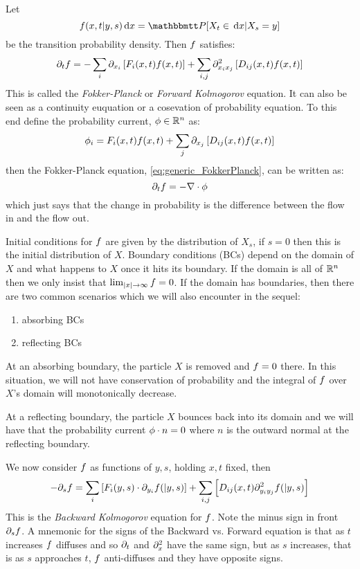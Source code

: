 Let 
\begin{equation}
 \f(x,t| y,s) \intd{x} =  \Prob[X_t \in \intd{x} | X_s = y]
 \label{eq:transition_prob_defn} 
 \end{equation}
be the transition probability density. Then ${f}$ satisfies:
\begin{equation}
{\partial}_t {f}= -\sum_i {\partial}_{x_i} \left[ F_i(x,t) {f}(x,t) \right] 
+ 
\sum_{i,j}  {\partial}^2_{x_i x_j} \left[ D_{ij}(x,t) {f}(x,t) \right]
\label{eq:generic_FokkerPlanck}
\end{equation} 
This is called the \emph{Fokker-Planck} or \emph{Forward Kolmogorov} equation.
It can also be seen as a continuity euquation or a cosevation of probability
equation. To this end define the probability current, ${ \phi } \in { \mathbb{R} }^n$ as:
$$
\phi_i =   F_i(x,t) {f}(x,t) 
+ 
\sum_{j}  {\partial}_{x_j} \left[ D_{ij}(x,t) {f}(x,t)\right]
$$
then the Fokker-Planck equation, \cref{eq:generic_FokkerPlanck}, can be written as:
$$
{\partial}_t {f}= -{ \nabla } \cdot \phi
$$
which just says that the change in probability is the
difference between the flow in and the flow out. 

Initial conditions for ${f}$ are given by the distribution of $X_s$, if $s=0$
then this is the initial distribution of $X$. Boundary conditions (BCs) depend
on the domain of $X$ and what happens to $X$ once it hits its boundary. If the domain
is all of ${ \mathbb{R} }^n$ then we only insist that $\lim_{|x| {\rightarrow} \infty} {f} = 0$. If the
domain has boundaries, then there are two common scenarios which we will also
encounter in the sequel:
\begin{enumerate}  
  \item absorbing BCs
  \item reflecting BCs
\end{enumerate}
At an absorbing boundary, the particle $X$ is removed and ${f}=0$ there.
In this situation, we will not have conservation of probability and the integral
of ${f}$ over $X$'s domain will monotonically decrease.

At a reflecting boundary, the particle $X$ bounces back into its domain and we
will have that the probability current ${ \phi }\cdot n = 0$ where $n$ is the outward
normal at the reflecting boundary.

We now consider ${f}$ as functions of $y,s$, holding $x,t$ fixed, then
\begin{equation}
-{\partial}_s {f}= \sum_i  \left[F_i(y,s) \cdot {\partial}_{y_i}{f}(|y,s) \right] 
+ 
\sum_{i,j}   \left[ D_{ij}(x,t) {\partial}^2_{y_i y_j}{f}(|y,s) \right]
\label{eq:FP_backward_pde}
\end{equation} 
This is the \emph{Backward Kolmogorov} equation for ${f}$. Note the minus sign
in front ${\partial}_s {f}$. A mnemonic for the signs of the Backward vs. Forward
equation is that as $t$ increases ${f}$ diffuses and so ${\partial}_t$ and ${\partial}^2_{x}$
have the same sign, but as $s$ increases, that is as $s$ approaches $t$, ${f}$
anti-diffuses and they have opposite signs. 
  

